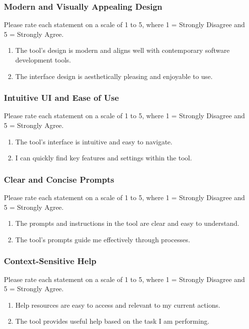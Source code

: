 \documentclass[12pt, titlepage]{article}
\begin{document}
\begin{appendices}
\subsubsection*{Modern and Visually Appealing Design}
Please rate each statement on a scale of 1 to 5, where 1 = Strongly Disagree and 5 = Strongly Agree.
\begin{enumerate}
  \item The tool's design is modern and aligns well with contemporary software development tools.
  \item The interface design is aesthetically pleasing and enjoyable to use.
\end{enumerate}

\subsubsection*{Intuitive UI and Ease of Use}
Please rate each statement on a scale of 1 to 5, where 1 = Strongly Disagree and 5 = Strongly Agree.
\begin{enumerate}
  \item The tool’s interface is intuitive and easy to navigate.
  \item I can quickly find key features and settings within the tool.
\end{enumerate}

\subsubsection*{Clear and Concise Prompts}
Please rate each statement on a scale of 1 to 5, where 1 = Strongly Disagree and 5 = Strongly Agree.
\begin{enumerate}
  \item The prompts and instructions in the tool are clear and easy to understand.
  \item The tool’s prompts guide me effectively through processes.
\end{enumerate}

\subsubsection*{Context-Sensitive Help}
Please rate each statement on a scale of 1 to 5, where 1 = Strongly Disagree and 5 = Strongly Agree.
\begin{enumerate}
  \item Help resources are easy to access and relevant to my current actions.
  \item The tool provides useful help based on the task I am performing.
\end{enumerate}


\end{appendices}
\end{document}
